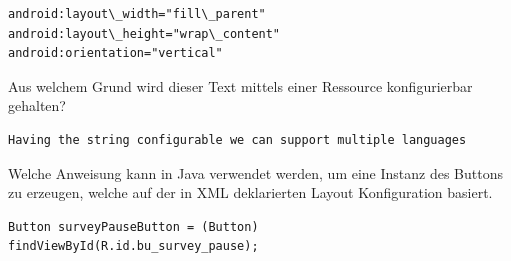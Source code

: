 \begin{lstlisting}
android:layout\_width="fill\_parent"
android:layout\_height="wrap\_content"
android:orientation="vertical"
\end{lstlisting}

Aus welchem Grund wird dieser Text mittels einer Ressource konfigurierbar
gehalten?
\begin{lstlisting}
Having the string configurable we can support multiple languages
\end{lstlisting}

Welche Anweisung kann in Java verwendet werden, um eine Instanz des Buttons zu
erzeugen, welche auf der in XML deklarierten Layout Konfiguration basiert.
\begin{lstlisting}
Button surveyPauseButton = (Button) findViewById(R.id.bu_survey_pause);
\end{lstlisting}
